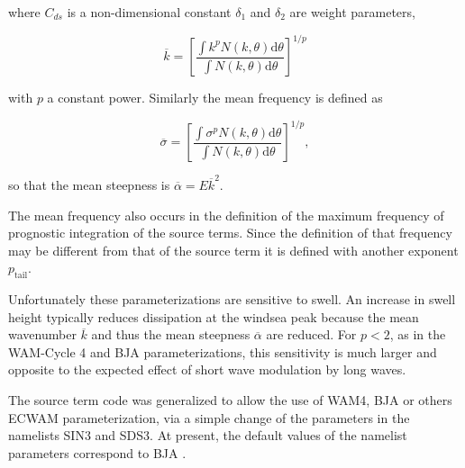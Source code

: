 \noindent
where $C_{ds}$ is a non-dimensional constant $\delta_1$ and $\delta_2$ are
weight parameters,

\begin{equation}
\overline{k}=\left[\frac{\int k^p N\left(k,\theta\right) {\mathrm d}
\theta}{\int N\left(k,\theta\right) {\mathrm d} \theta}\right]^{1/p}
\end{equation}

\noindent
with $p$ a constant power. Similarly the mean frequency is defined as

\begin{equation}
\overline{\sigma}=\left[\frac{\int \sigma^p N\left(k,\theta\right) {\mathrm d}
\theta}{ \int N\left(k,\theta\right) {\mathrm d} \theta}\right]^{1/p},
\end{equation}

\noindent
so that the mean steepness is $\overline{\alpha}=E \overline{k}^2$.

The mean frequency also occurs in the definition of the maximum frequency of
prognostic integration of the source terms. Since the definition of that
frequency may be different from that of the source term it is defined with
another exponent $p_{\mathrm{tail}}$.

Unfortunately these parameterizations are sensitive to swell. An increase in
swell height typically reduces dissipation at the windsea peak because the mean wavenumber $\overline{k}$ and 
thus the mean steepness $\overline{\alpha}$ are reduced. For $p< 2$, as in the WAM-Cycle 4 and BJA
parameterizations, this sensitivity is much larger and opposite to the expected effect of
short wave modulation by long waves.

The source term code was generalized to
allow the use of WAM4, BJA or others ECWAM parameterization, via a simple change of
the parameters in the namelists SIN3 and SDS3. At present, the default values of the namelist
parameters correspond to BJA \citep{rep:Bea05}.

